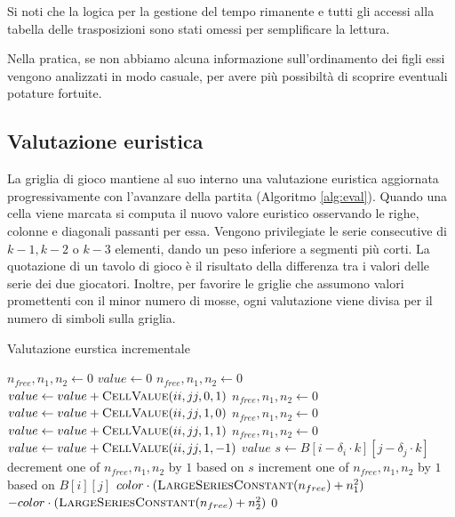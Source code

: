 \documentclass{article}
\begin{document}
Si noti che la logica per la gestione del tempo rimanente e tutti gli accessi
alla tabella delle trasposizioni sono stati omessi per semplificare la lettura.

Nella pratica, se non abbiamo alcuna informazione sull'ordinamento dei figli
essi vengono analizzati in modo casuale, per avere pi\`u possibilt\`a di scoprire
eventuali potature fortuite.

\subsection{Valutazione euristica}

La griglia di gioco mantiene al suo interno una valutazione euristica 
aggiornata progressivamente con l'avanzare della partita (Algoritmo \vref{alg:eval}).
Quando una cella viene marcata si computa il nuovo valore euristico osservando
le righe, colonne e diagonali passanti per essa. Vengono privilegiate le serie consecutive 
di $k-1, k-2$ o $k-3$ elementi, dando un peso inferiore a segmenti pi\`u corti.
La quotazione di un tavolo di gioco \`e il risultato della differenza tra i
valori delle serie dei due giocatori. Inoltre, per favorire le griglie che
assumono valori promettenti con il minor numero di mosse, ogni
valutazione viene divisa per il numero di simboli sulla griglia.

\begin{algorithm}[H]
  \caption{Valutazione eurstica incrementale}
  \label{alg:eval}
  \begin{algorithmic}[0]
    \State $n_{free}, n_1, n_2 \gets 0$
      \State $value \gets 0$
      \State $n_{free}, n_1, n_2 \gets 0$
        \State $value \gets value + \Call{CellValue}{ii, jj, 0, 1}$
      \EndFor
      \State $n_{free}, n_1, n_2 \gets 0$
        \State $value \gets value + \Call{CellValue}{ii, jj, 1, 0}$
      \EndFor
      \State $n_{free}, n_1, n_2 \gets 0$
        \State $value \gets value + \Call{CellValue}{ii, jj, 1, 1}$
      \EndFor
      \State $n_{free}, n_1, n_2 \gets 0$
        \State $value \gets value + \Call{CellValue}{ii, jj, 1, -1}$
      \EndFor
      \State \Return $value$
    \EndProcedure
       
        \State $s \gets B[i - \delta_i \cdot k][j - \delta_j \cdot k]$ 
        \State decrement one of $n_{free}, n_1, n_2$ by $1$ based on $s$
      \EndIf
      \State increment one of $n_{free}, n_1, n_2$ by $1$ based on $B[i][j]$
      \Statex
        \State \Return $color \cdot (\Call{LargeSeriesConstant}{n_{free}} + n_1^2)$
        \State \Return $-color \cdot (\Call{LargeSeriesConstant}{n_{free}} + n_2^2)$
      \Else
        \State \Return $0$
      \EndIf
    \EndProcedure
  \end{algorithmic}
\end{algorithm}
\end{document}
